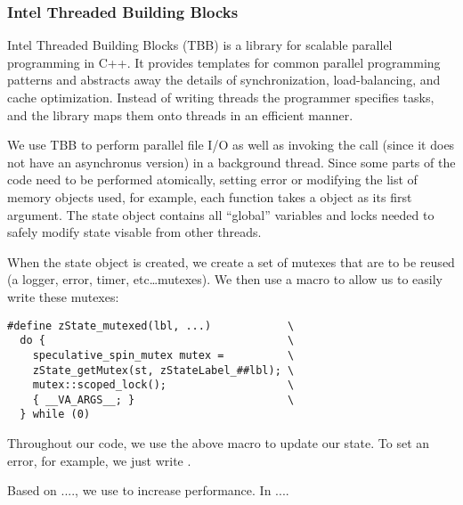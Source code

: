 
\subsubsection{Intel Threaded Building Blocks}
Intel Threaded Building Blocks \cite{reinders2007intel} (TBB) is a library for
scalable parallel
programming in C++. It provides templates for common parallel programming
patterns and abstracts away the details of synchronization, load-balancing,
and cache optimization. Instead of writing threads the programmer specifies
tasks, and the library maps them onto threads in an efficient manner.

We use TBB to perform parallel file I/O as well as invoking the
	 call (since it does not have an asynchronus version)
	in a background thread.
Since some parts of the code need to be performed atomically, 
	setting error or modifying the list of memory objects used, for example,
	each function takes a  object as its first argument.
The state object contains all ``global'' variables and locks needed to 
	safely modify state visable from other threads.


When the state object is created, we create a set of mutexes that
	are to be reused (a logger, error, timer, etc\ldots mutexes).
We then use a macro to allow us to easily write these mutexes:

\begin{verbatim}
#define zState_mutexed(lbl, ...)            \
  do {                                      \
    speculative_spin_mutex mutex =          \
    zState_getMutex(st, zStateLabel_##lbl); \
    mutex::scoped_lock();                   \
    { __VA_ARGS__; }                        \
  } while (0)
\end{verbatim}


Throughout our code, we use the above macro to update our state.
To set an error, for example, we just write .


Based on ...., we use  to increase performance.
In ....
\todo[inline]{Why we use \fix{speculative\_spin\_mutex}}